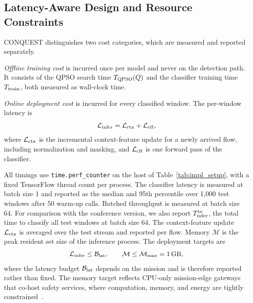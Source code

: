 \documentclass[conference]{IEEEtran}
\begin{document}
\subsection{Latency-Aware Design and Resource Constraints}
\label{subsec:latency_design}
CONQUEST distinguishes two cost
categories, which are measured and reported separately.

\textit{Offline training cost} is incurred
once per model and never on the detection path. It consists of the
QPSO search time $T_{\rm QPSO}(Q)$ and the classifier training time
$T_{\rm train}$, both measured as wall-clock time.

\textit{Online deployment cost} is incurred
for every classified window. The per-window latency is
\begin{equation}
\mathcal{L}_{\rm infer} =
\mathcal{L}_{\rm ctx} + \mathcal{L}_{\rm clf},
\label{eq:latency_decomp}
\end{equation}
where $\mathcal{L}_{\rm ctx}$ is the
incremental context-feature update for a newly arrived flow,
including normalization and masking, and $\mathcal{L}_{\rm clf}$ is
one forward pass of the classifier.

All timings use \texttt{time.perf\_counter}
on the host of Table~\ref{tab:impl_setup}, with a fixed TensorFlow
thread count per process. The classifier latency is measured at batch
size 1 and reported as the median and 95th percentile over 1{,}000
test windows after 50 warm-up calls. Batched throughput is measured
at batch size 64. For comparison with the conference version, we also
report $T_{\rm infer}^{\rm te}$, the total time to classify all test
windows at batch size 64. The context-feature update
$\mathcal{L}_{\rm ctx}$ is averaged over the test stream and reported
per flow. Memory $\mathcal{M}$ is the peak resident set size of the
inference process. The deployment targets are
\begin{equation}
\mathcal{L}_{\rm infer}\le\mathcal{B}_{\rm lat},
\qquad
\mathcal{M}\le\mathcal{M}_{\max}=1\,\text{GB},
\label{eq:memory_constraint}
\end{equation}
where the latency budget
$\mathcal{B}_{\rm lat}$ depends on the mission and is therefore
reported rather than fixed. The memory target reflects CPU-only
mission-edge gateways that co-host safety services, where
computation, memory, and energy are tightly
constrained~\cite{amadi2026lightweight}.

\end{document}
